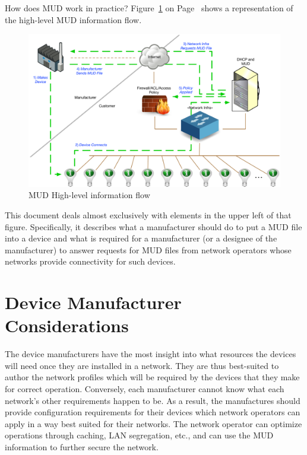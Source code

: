 \documentclass[conference]{IEEEtran}
\begin{document}
How does MUD work in practice?  Figure~\ref{fig:MUDNetwork} on
Page~\pageref{fig:MUDNetwork} shows a
representation of the high-level MUD information flow.
\begin{figure}
  \begin{center}
    \includegraphics[width=\textwidth]{Graphics/MUDNetworkFlow}
    \caption{MUD High-level information flow}
    \label{fig:MUDNetwork}
  \end{center}
\end{figure}
This document deals almost exclusively with elements in the upper left
of that figure.  Specifically, it describes what a manufacturer should
do to put a MUD file into a device and what is required for a
manufacturer (or a designee of the manufacturer) to answer requests
for MUD files from network operators whose networks provide
connectivity for such devices.


\section{Device Manufacturer Considerations}
The device manufacturers have the most insight into what resources the
devices will need once they are installed in a network.  They are thus
best-suited to author the network profiles which will be required by
the devices that they make for correct operation.  Conversely, each
manufacturer cannot know what each network's other requirements happen
to be.  As a result, the manufactures should provide configuration
requirements for their devices which network operators can apply in a
way best suited for their networks.  The network operator can optimize
operations through caching, LAN segregation, etc., and can use the MUD
information to further secure the network.
\end{document}
